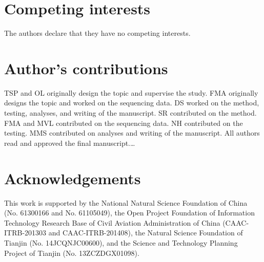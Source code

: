\documentclass{bmcart}
\begin{document}
\begin{backmatter}

\section*{Competing interests}
  The authors declare that they have no competing interests.

\section*{Author's contributions}
    TSP and OL originally design the topic and supervise the study. FMA originally designs the topic and worked on the sequencing data. DS worked on the method, testing, analyses, and writing of the manuscript. SR contributed on the method. FMA and MVL contributed on the sequencing data. NH contributed on the testing. MMS contributed on analyses and writing of the manuscript. All authors read and approved the final manuscript.\ldots

\section*{Acknowledgements}
This work is supported by the National Natural Science Foundation of China (No. 61300166 and No. 61105049), the Open Project Foundation of Information Technology Research Base of Civil Aviation Administration of China (CAAC-ITRB-201303 and CAAC-ITRB-201408), the Natural Science Foundation of Tianjin (No. 14JCQNJC00600), and the Science and Technology Planning Project of Tianjin (No. 13ZCZDGX01098).



\end{backmatter}
\end{document}
